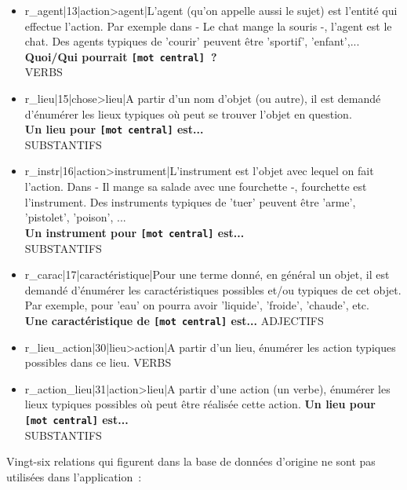 \documentclass[a4paper,11pt,french]{article}
\begin{document}
\begin{itemize}
\item r\_agent|13|action>agent|L'agent (qu'on appelle aussi le sujet) est l'entité qui effectue l'action. Par exemple dans - Le chat mange la souris -, l'agent est le chat. Des agents typiques de 'courir' peuvent être 'sportif', 'enfant',... \\
{\bf Quoi/Qui pourrait \verb![mot central]!~?} \\
VERBS

\item r\_lieu|15|chose>lieu|A partir d'un nom d'objet (ou autre), il est demandé d'énumérer les lieux typiques où peut se trouver l'objet en question. \\
{\bf Un lieu pour \verb![mot central]! est...} \\
SUBSTANTIFS

\item r\_instr|16|action>instrument|L'instrument est l'objet avec lequel on fait l'action. Dans - Il mange sa salade avec une fourchette -, fourchette est l'instrument. Des instruments typiques de 'tuer' peuvent être 'arme', 'pistolet', 'poison', ... \\
{\bf Un instrument pour \verb![mot central]! est...} \\
SUBSTANTIFS

\item r\_carac|17|caractéristique|Pour une terme donné, en général un objet, il est demandé d'énumérer les caractéristiques possibles et/ou typiques de cet objet. Par exemple, pour 'eau' on pourra avoir 'liquide', 'froide', 'chaude', etc. \\
{\bf Une caractéristique de \verb![mot central]! est...}
ADJECTIFS

\item r\_lieu\_action|30|lieu>action|A partir d'un lieu, énumérer les action typiques possibles dans ce lieu.
VERBS

\item r\_action\_lieu|31|action>lieu|A partir d'une action (un verbe), énumérer les lieux typiques possibles où peut être réalisée cette action.
{\bf Un lieu pour \verb![mot central]! est...} \\
SUBSTANTIFS

\end{itemize}

Vingt-six relations qui figurent dans la base de données d'origine ne sont pas utilisées dans l'application~:
\end{document}
